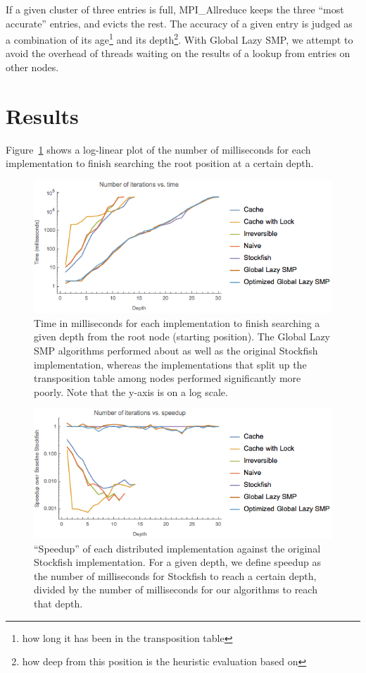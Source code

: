 \documentclass{article}
\begin{document}
If a given cluster of three entries is full, {MPI\_Allreduce}
keeps the three ``most accurate'' entries, and evicts the rest. The accuracy of
a given entry is judged as a combination of its age\footnote{how long it has
been in the transposition table} and its depth\footnote{how deep from this
position is the heuristic evaluation based on}. With Global Lazy SMP, we
attempt to avoid the overhead of threads waiting on the results of a lookup from
entries on other nodes.

\section{Results}\label{Results}
Figure~\ref{fig:ttd} shows a log-linear plot of the number of milliseconds for
each implementation to finish searching the root position at a certain depth. 

\begin{figure}
	\includegraphics[width=\textwidth]{../plots/timetodepth}
	\caption{Time in milliseconds for each implementation to finish
	searching a given depth from the root node (starting position). The
	Global Lazy SMP algorithms performed about as well as the original
	Stockfish implementation, whereas the implementations that split up the
	transposition table among nodes performed significantly more poorly.
	Note that the y-axis is on a log scale.}
	\label{fig:ttd}
\end{figure}

\begin{figure}
	\includegraphics[width=\textwidth]{../plots/speedup}
	\caption{``Speedup'' of each distributed implementation against the
	original Stockfish implementation. For a given depth, we define speedup
	as the number of milliseconds for Stockfish to reach a certain depth,
	divided by the number of milliseconds for our algorithms to reach that
	depth.}
	\label{fig:speedup}
\end{figure}
\end{document}
